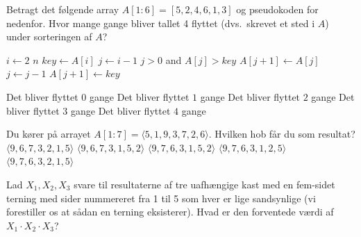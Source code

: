 Betragt det følgende array \(A[1:6] = [5,2,4,6,1,3]\) og pseudokoden for  nedenfor.
Hvor mange gange bliver tallet 4 flyttet
(dvs.~skrevet et sted i $A$) under sorteringen af \(A\)?
\begin{codebox}
  \li \For $i \gets 2$ \To $n$ \Do
  \li $key \gets A[i]$
  \li $j \gets i-1$
  \li \While $j > 0$ and $A[j] > key$ \Do
  \li $A[j+1] \gets A[j]$
  \li $j \gets j-1$ \End
  \li $A[j+1] \gets key$
  \End
\end{codebox}
\etsvar
\mulighederstart
\svar Det bliver flyttet \(0\) gange
\svar Det bliver flyttet \(1\) gange
\svar Det bliver flyttet \(2\) gange 
\svar Det bliver flyttet \(3\) gange \korrekt
\svar Det bliver flyttet \(4\) gange
\mulighederslut
{}


Du kører  på arrayet \(A[1:7] = \langle 5, 1, 9, 3, 7, 2, 6 \rangle\).
Hvilken hob får du som resultat?
\etsvar
\mulighederstart
\svar \(\langle 9, 6, 7, 3, 2, 1, 5 \rangle\)
\svar \(\langle 9, 6, 7, 3, 1, 5, 2 \rangle\)
\svar \(\langle 9, 7, 6, 3, 1, 5, 2 \rangle\)
\svar \(\langle 9, 7, 6, 3, 1, 2, 5 \rangle\) \korrekt
\svar \(\langle 9, 7, 6, 3, 2, 1, 5 \rangle\)
\mulighederslut
{}
\sideskift

Lad \(X_{1}, X_{2}, X_{3}\) svare til resultaterne af tre uafhængige kast med en fem-sidet terning med sider nummereret fra 1 til 5 som hver er lige sandsynlige (vi forestiller os at sådan en terning eksisterer).
Hvad er den forventede værdi af \(X_{1}\cdot X_{2}\cdot X_{3}\)?

